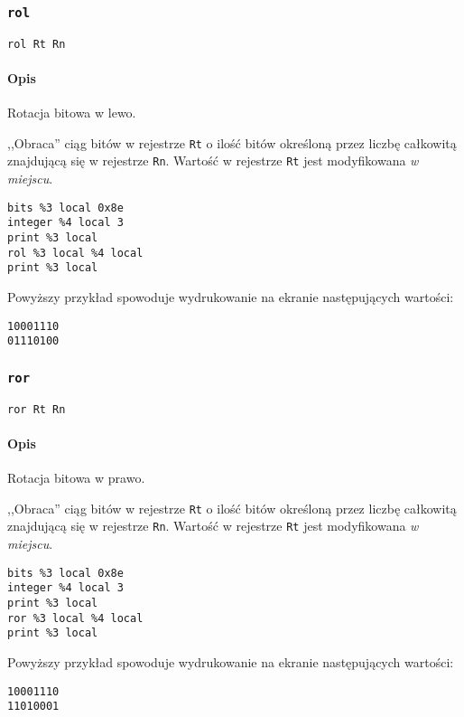 \subsubsection{\texttt{rol}}

\begin{lstlisting}
rol Rt Rn
\end{lstlisting}

\paragraph*{Opis} Rotacja bitowa w lewo.

,,Obraca'' ciąg bitów w rejestrze \texttt{Rt} o ilość bitów określoną przez
liczbę całkowitą znajdującą się w rejestrze \texttt{Rn}. Wartość w rejestrze
\texttt{Rt} jest modyfikowana \emph{w miejscu}.
\begin{lstlisting}
bits %3 local 0x8e
integer %4 local 3
print %3 local
rol %3 local %4 local
print %3 local
\end{lstlisting}

Powyższy przykład spowoduje wydrukowanie na ekranie następujących wartości:
\begin{lstlisting}
10001110
01110100
\end{lstlisting}

\subsubsection{\texttt{ror}}

\begin{lstlisting}
ror Rt Rn
\end{lstlisting}

\paragraph*{Opis} Rotacja bitowa w prawo.

,,Obraca'' ciąg bitów w rejestrze \texttt{Rt} o ilość bitów określoną przez
liczbę całkowitą znajdującą się w rejestrze \texttt{Rn}. Wartość w rejestrze
\texttt{Rt} jest modyfikowana \emph{w miejscu}.
\begin{lstlisting}
bits %3 local 0x8e
integer %4 local 3
print %3 local
ror %3 local %4 local
print %3 local
\end{lstlisting}

Powyższy przykład spowoduje wydrukowanie na ekranie następujących wartości:
\begin{lstlisting}
10001110
11010001
\end{lstlisting}
